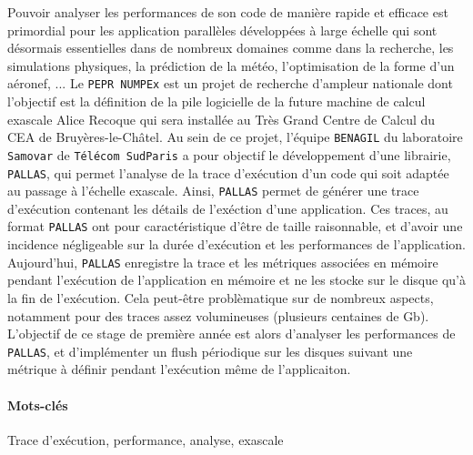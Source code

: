

Pouvoir analyser les performances de son code de manière rapide et efficace est primordial pour les application parallèles développées à large échelle qui sont désormais essentielles dans de nombreux domaines comme dans la recherche, les simulations physiques, la prédiction de la météo, l'optimisation de la forme d'un aéronef, ... \newline
Le \verb!PEPR NUMPEx! est un projet de recherche d'ampleur nationale dont l'objectif est la définition de la pile logicielle de la future machine de calcul exascale Alice Recoque qui sera installée au Très Grand Centre de Calcul du CEA de Bruyères-le-Châtel. Au sein de ce projet, l'équipe \verb!BENAGIL! du laboratoire \verb!Samovar! de \verb!Télécom SudParis! a pour objectif le développement d'une librairie, \verb!PALLAS!, qui permet l'analyse de la trace d'exécution d'un code qui soit adaptée au passage à l'échelle exascale. Ainsi, \verb!PALLAS! permet de générer une trace d'exécution contenant les détails de l'exéction d'une application. Ces traces, au format \verb!PALLAS! ont pour caractéristique d'être de taille raisonnable, et d'avoir une incidence négligeable sur la durée d'exécution et les performances de l'application.\newline
Aujourd'hui, \verb!PALLAS! enregistre la trace et les métriques associées en mémoire pendant l'exécution de l'application en mémoire et ne les stocke sur le disque qu'à la fin de l'exécution. Cela peut-être problèmatique sur de nombreux aspects, notamment pour des traces assez volumineuses (plusieurs centaines de Gb).
L'objectif de ce stage de première année est alors d'analyser les performances de \verb!PALLAS!, et d'implémenter un flush périodique sur les disques suivant une métrique à définir pendant l'exécution même de l'applicaiton.



\paragraph*{Mots-clés}\label{par:mots-cles}


Trace d'exécution, performance, analyse, exascale
